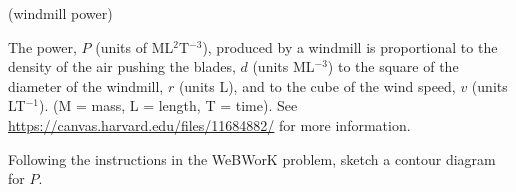 \documentclass[12pt,letterpaper]{exam}
\begin{document}
\begin{questions}
\begin{parts}


\end{parts}




\question (windmill power)

The power, $P$ (units of ML$^2$T$^{-3}$), produced by a windmill is proportional to the density of the air pushing the blades, $d$ (units ML$^{-3}$) to the square of the diameter of the windmill, $r$ (units L), and to the cube of the wind speed, $v$ (units LT$^{-1}$).  (M = mass, L = length, T = time).  See 
\url{https://canvas.harvard.edu/files/11684882/}
for more information.

Following the instructions in the WeBWorK problem, sketch a contour diagram for $P$.


\end{questions}
\end{document}

